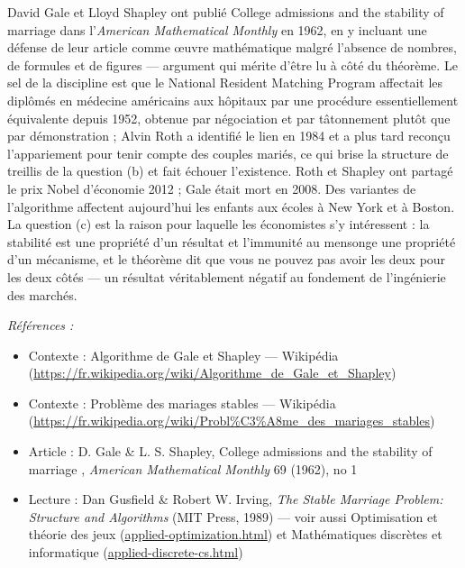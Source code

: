 \documentclass[11pt]{article}
\newenvironment{refs}{\par\small\noindent\emph{Références :}\begin{itemize}\setlength\itemsep{0pt}}{\end{itemize}\normalsize}
\begin{document}
\noindent David Gale et Lloyd Shapley ont publié \og{} College admissions and the
stability of marriage \fg{} dans l'\textit{American Mathematical Monthly} en 1962, en y incluant
une défense de leur article comme \oe{}uvre mathématique malgré l'absence de nombres, de formules
et de figures --- argument qui mérite d'être lu à côté du théorème. Le sel de la discipline est
que le National Resident Matching Program affectait les diplômés en médecine américains aux
hôpitaux par une procédure essentiellement équivalente depuis 1952, obtenue par négociation
et par tâtonnement plutôt que par démonstration ; Alvin Roth a identifié le lien en 1984 et a
plus tard reconçu l'appariement pour tenir compte des couples mariés, ce qui brise la
structure de treillis de la question (b) et fait échouer l'existence. Roth et Shapley ont
partagé le prix Nobel d'économie 2012 ; Gale était mort en 2008. Des variantes de
l'algorithme affectent aujourd'hui les enfants aux écoles à New York et à Boston. La question
(c) est la raison pour laquelle les économistes s'y intéressent : la stabilité est une
propriété d'un résultat et l'immunité au mensonge une propriété d'un mécanisme, et le
théorème dit que vous ne pouvez pas avoir les deux pour les deux côtés --- un résultat
véritablement négatif au fondement de l'ingénierie des marchés.

\begin{refs}
\item Contexte : Algorithme de Gale et Shapley --- Wikipédia (\url{https://fr.wikipedia.org/wiki/Algorithme_de_Gale_et_Shapley})
\item Contexte : Problème des mariages stables --- Wikipédia (\url{https://fr.wikipedia.org/wiki/Probl%C3%A8me_des_mariages_stables})
\item Article : D. Gale \& L. S. Shapley, \og{} College admissions and the stability of marriage \fg{}, \textit{American Mathematical Monthly} 69 (1962), no 1
\item Lecture : Dan Gusfield \& Robert W. Irving, \textit{The Stable Marriage Problem: Structure and Algorithms} (MIT Press, 1989) --- voir aussi Optimisation et théorie des jeux (\url{applied-optimization.html}) et Mathématiques discrètes et informatique (\url{applied-discrete-cs.html})
\end{refs}

\bigskip
\end{document}
